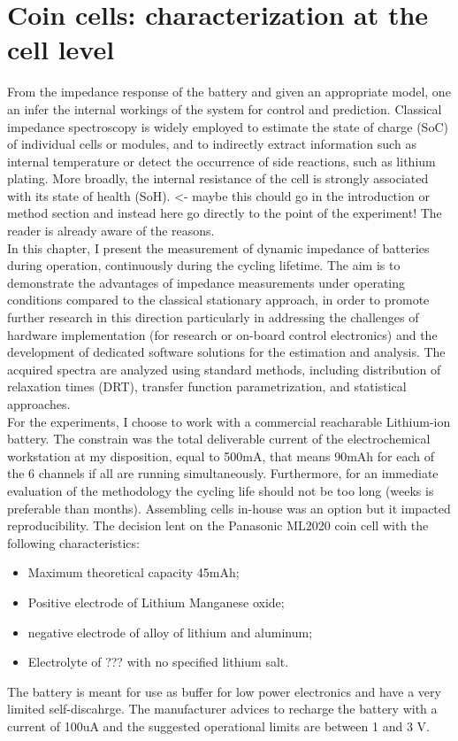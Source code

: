 \chapter{Coin cells: characterization at the cell level}

From the impedance response of the battery and given an appropriate model, one an infer the internal workings of the system for control and prediction. Classical impedance spectroscopy is widely employed to estimate the state of charge (SoC) of individual cells or modules, and to indirectly extract information such as internal temperature or detect the occurrence of side reactions, such as lithium plating. More broadly, the internal resistance of the cell is strongly associated with its state of health (SoH). <- maybe this chould go in the introduction or method section and instead here go directly to the point of the experiment! The reader is already aware of the reasons.\\

In this chapter, I present the measurement of dynamic impedance of batteries during operation, continuously during the cycling lifetime. The aim is to demonstrate the advantages of impedance measurements under operating conditions compared to the classical stationary approach, in order to promote further research in this direction particularly in addressing the challenges of hardware implementation (for research or on-board control electronics) and the development of dedicated software solutions for the estimation and analysis. The acquired spectra are analyzed using standard methods, including distribution of relaxation times (DRT), transfer function parametrization, and statistical approaches.\\

For the experiments, I choose to work with a commercial reacharable Lithium-ion battery. The constrain was the total deliverable current of the electrochemical workstation at my disposition, equal to 500mA, that means 90mAh for each of the 6 channels if all are running simultaneously. Furthermore, for an immediate evaluation of the methodology the cycling life should not be too long (weeks is preferable than months). Assembling cells in-house was an option but it impacted reproducibility. The decision lent on the Panasonic ML2020 coin cell with the following characteristics:
\begin{itemize}
    \item Maximum theoretical capacity 45mAh;
    \item Positive electrode of Lithium Manganese oxide;
    \item negative electrode of alloy of lithium and aluminum;
    \item Electrolyte of ??? with no specified lithium salt.
\end{itemize}
The battery is meant for use as buffer for low power electronics and have a very limited self-discahrge. The manufacturer advices to recharge the battery with a current of 100uA and the suggested operational limits are between 1 and 3 V.\\

